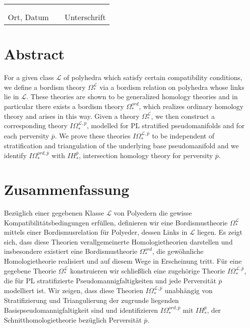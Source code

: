 \documentclass{scrreprt}
\begin{document}
\vspace{2cm}

\begin{tabular}{lp{2em}l}
 \hspace{4cm} && \hspace{7cm} \\ \cline{1-1}\cline{3-3} \\
 Ort, Datum && Unterschrift
\end{tabular}
\newpage

\section*{Abstract}
For a given class $\mathcal{L}$ of polyhedra which satisfy certain compatibility conditions, we define a bordism theory $\Omega_*^{\mathcal{L}}$ via a bordism relation on polyhedra whose links lie in $\mathcal{L}$. These theories are shown to be generalized homology theories and in particular there exists a bordism theory $\Omega_*^{ord}$, which realizes ordinary homology theory and arises in this way. Given a theory $\Omega_*^{\mathcal{L}}$, we then construct a corresponding theory $I\Omega_*^{\mathcal{L},\overline{p}}$, modelled for PL stratified pseudomanifolds and for each perversity $\overline{p}$. We prove these theories $I\Omega_*^{\mathcal{L},\overline{p}}$ to be independent of stratification and triangulation of the underlying base pseudomanifold and we identify $I\Omega_*^{ord,\overline{p}}$ with $IH_*^{\overline{p}}$, intersection homology theory for perversity $\overline{p}$.

\section*{Zusammenfassung}
Bez\"uglich einer gegebenen Klasse $\mathcal{L}$ von Polyedern die gewisse Kompatibilit\"atsbedingungen erf\"ullen, definieren wir eine Bordismustheorie $\Omega_*^{\mathcal{L}}$ mittels einer Bordismusrelation f\"ur Polyeder, dessen Links in $\mathcal{L}$ liegen. Es zeigt sich, dass diese Theorien verallgemeinerte Homologietheorien darstellen und insbesondere existiert eine Bordismustheorie $\Omega_*^{ord}$, die gew\"ohnliche Homologietheorie realisiert und auf diesem Wege in Erscheinung tritt. F\"ur eine gegebene Theorie $\Omega_*^{\mathcal{L}}$ konstruieren wir schlie{\ss}lich eine zugeh\"orige Theorie $I\Omega_*^{\mathcal{L},\overline{p}}$, die f\"ur PL stratifizierte Pseudomannigfaltigkeiten und jede Perversit\"at $\overline{p}$ modelliert ist. Wir zeigen, dass diese Theorien $I\Omega_*^{\mathcal{L},\overline{p}}$ unabh\"angig von Stratifizierung und Triangulierung der zugrunde liegenden Basispseudomannigfaltigkeit sind und identifizieren $I\Omega_*^{ord,\overline{p}}$ mit $IH_*^{\overline{p}}$, der Schnitthomologietheorie bez\"uglich Perversit\"at $\overline{p}$.
\end{document}
